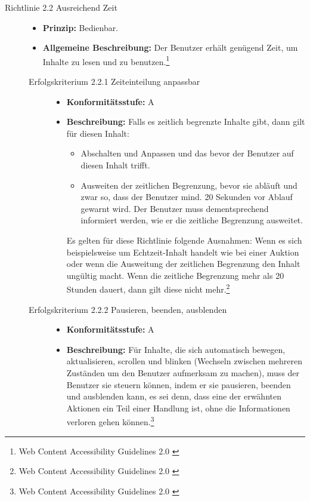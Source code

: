 \begin{description}
	\item[Richtlinie 2.2 Ausreichend Zeit]\hfill
	\begin{itemize}
		\item \textbf{Prinzip:} Bedienbar.
		\item \textbf{Allgemeine Beschreibung:} Der Benutzer erhält genügend Zeit, um Inhalte zu lesen und zu benutzen.\footnote{Web Content Accessibility Guidelines 2.0 \cite{WCAG2.0}}
	\end{itemize}
	
	\begin{description}
		\item[Erfolgskriterium 2.2.1 Zeiteinteilung anpassbar]\hfill
		\begin{itemize}
			\item \textbf{Konformitätsstufe:} A
			\item \textbf{Beschreibung:} Falls es zeitlich begrenzte Inhalte gibt, dann gilt für diesen Inhalt:
			\begin{itemize}
				\item Abschalten und Anpassen und das bevor der Benutzer auf diesen Inhalt trifft.
				\item Ausweiten der zeitlichen Begrenzung, bevor sie abläuft und zwar so, dass der Benutzer mind. 20 Sekunden vor Ablauf gewarnt wird. Der Benutzer muss 
				dementsprechend informiert werden, wie er die zeitliche Begrenzung ausweitet.
			\end{itemize}
			Es gelten für diese Richtlinie folgende Ausnahmen: Wenn es sich beispielsweise um Echtzeit-Inhalt handelt wie bei einer Auktion oder wenn die Ausweitung 
			der zeitlichen Begrenzung den Inhalt ungültig macht. Wenn die zeitliche Begrenzung mehr als 20 Stunden dauert, dann gilt diese nicht 
			mehr.\footnote{Web Content Accessibility Guidelines 2.0 \cite{WCAG2.0}}
		\end{itemize}
		
		\item[Erfolgskriterium 2.2.2 Pausieren, beenden, ausblenden]\hfill
		\begin{itemize}
			\item \textbf{Konformitätsstufe:} A
			\item \textbf{Beschreibung:} Für Inhalte, die sich automatisch bewegen, aktualisieren, scrollen und blinken (Wechseln zwischen mehreren Zuständen um den 
			Benutzer aufmerksam zu machen), muss der Benutzer sie steuern können, indem er sie pausieren, beenden und ausblenden kann, es sei denn, dass eine der 
			erwähnten Aktionen ein Teil einer Handlung ist, ohne die Informationen verloren gehen können.\footnote{Web Content Accessibility Guidelines 2.0 \cite{WCAG2.0}}
		\end{itemize}
		

\end{description}
\end{description}
